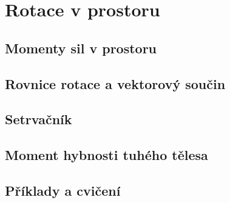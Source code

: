 \chapter{Rotace v prostoru}\label{fyz:IchapXX}
\minitoc
  \section{Momenty sil v prostoru}\label{fyz:IchapXXsecI}
  \section{Rovnice rotace a vektorový součin}\label{fyz:IchapXXsecII}
  \section{Setrvačník}\label{fyz:IchapXXsecIII}
  \section{Moment hybnosti tuhého tělesa}\label{fyz:IchapXXsecIV}
  \section{Příklady a cvičení}\label{fyz:IchapXXsecV}  